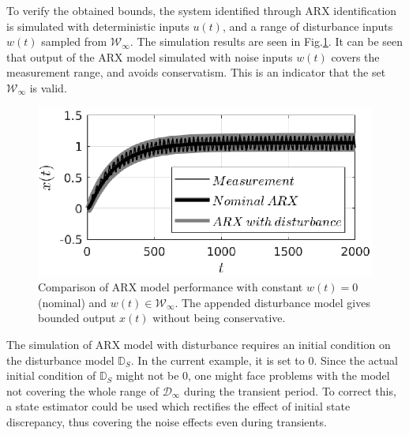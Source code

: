 \documentclass[letterpaper, 10 pt, conference]{ieeeconf}  %
\begin{document}
	To verify the obtained bounds, the system identified through ARX identification is simulated with deterministic inputs $u(t)$, and a range of disturbance inputs $w(t)$ sampled from $\mathcal{W}_{\infty}$. The simulation results are seen in Fig.\ref{simulation}. It can be seen that output of the ARX model simulated with noise inputs $w(t)$ covers the measurement range, and avoids conservatism. This is an indicator that the set $\mathcal{W}_{\infty}$ is valid.
	\begin{figure}[h]
		\hspace{22pt}
		\includegraphics[scale = 0.70]{simulation.eps}
		\caption{Comparison of ARX model performance with constant $w(t)=0$(nominal) and $w(t)\in \mathcal{W}_{\infty}$. The appended disturbance model gives bounded output $x(t)$ without being conservative.}
		\label{simulation}
	\end{figure} 
	The simulation of ARX model with disturbance requires an initial condition on the disturbance model $\mathbb{D}_S$. In the current example, it is set to $0$. Since the actual initial condition of $\mathbb{D}_S$ might not be $0$, one might face problems with the model not covering the whole range of $\mathcal{D}_{\infty}$ during the transient period. To correct this, a state estimator could be used which rectifies the effect of initial state discrepancy, thus covering the noise effects even during transients.
	\fi
\end{document}
